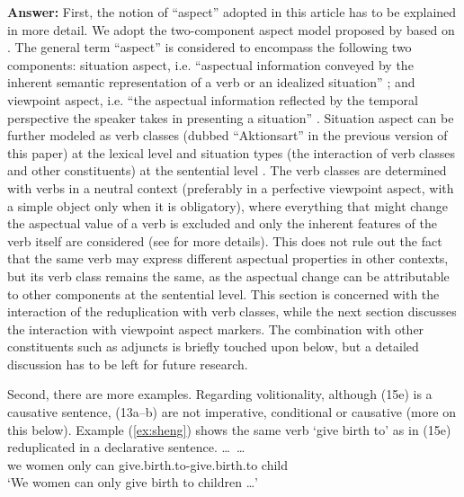 \documentclass[fleqn,twoside]{article}
\begin{document}
\begin{enumerate}
\noindent
\textbf{Answer:}
First, the notion of ``aspect'' adopted in this article has to be explained in more detail.
We adopt the two-component aspect model proposed by \citet{XiaoMcEnery2004} based on \citet{Smith1991}.
The general term ``aspect'' is considered to encompass the following two components:
situation aspect, i.e. ``aspectual information conveyed by the inherent semantic representation of a verb or an idealized situation'' \citep[21]{XiaoMcEnery2004};
and viewpoint aspect, i.e. ``the aspectual information reflected by the temporal perspective the speaker takes in presenting a situation'' \citep[21]{XiaoMcEnery2004}.
Situation aspect can be further modeled as verb classes (dubbed ``Aktionsart'' in the previous version of this paper) at the lexical level
and situation types (the interaction of verb classes and other constituents) at the sentential level \citep[33]{XiaoMcEnery2004}.
The verb classes are determined with verbs in a neutral context (preferably in a perfective viewpoint aspect, with a simple object only when it is obligatory),
where everything that might change the aspectual value of a verb is excluded
and only the inherent features of the verb itself are considered
(see \citealt[52]{XiaoMcEnery2004} for more details).
This does not rule out the fact that the same verb may express different aspectual properties in other contexts,
but its verb class remains the same,
as the aspectual change can be attributable to other components at the sentential level.
This section is concerned with the interaction of the reduplication with verb classes,
while the next section discusses the interaction with viewpoint aspect markers.
The combination with other constituents such as adjuncts is briefly touched upon below,
but a detailed discussion has to be left for future research.

Second, there are more examples.
Regarding volitionality, although (15e) is a causative sentence, (13a--b) are not imperative, conditional or causative (more on this below).
Example (\ref{ex:sheng}) shows the same verb  `give birth to' as in (15e) reduplicated in a declarative sentence.
\ea\label{ex:sheng}%
\gll {}  \ldots\,     \ldots \\
we women {} only can give.birth.to-give.birth.to child\\
\glt `We women can only give birth to children \ldots'
\z


\end{enumerate}
\end{document}
